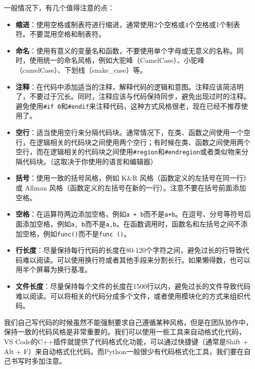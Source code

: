 \documentclass[../main.tex]{subfiles}
\begin{document}
一般情况下，有几个值得注意的点：
\begin{itemize}
  \item \textbf{缩进}：使用空格或制表符进行缩进，通常使用2个空格或4个空格或1个制表符。不要混用空格和制表符。
  \item \textbf{命名}：使用有意义的变量名和函数，不要使用单个字母或无意义的名称。同时，使用统一的命名风格，例如大驼峰（CamelCase）、小驼峰（camelCase）、下划线（snake\_case）等。
  \item \textbf{注释}：在代码中添加适当的注释，解释代码的逻辑和意图。注释应该简洁明了，不要过于冗长。同时，注释应该与代码保持同步，避免出现过时的注释。避免使用\texttt{\#if 0}和\texttt{\#endif}来注释代码，这种方式风格很老，现在已经不推荐使用了。
  \item \textbf{空行}：适当使用空行来分隔代码块。通常情况下，在类、函数之间使用一个空行，在逻辑相关的代码块之间使用两个空行；有时候在类、函数之间使用两个空行，而在逻辑相关的代码块之间使用\texttt{\#region}和\texttt{\#endregion}或者类似物来分隔代码块。（这取决于你使用的语言和编辑器）
  \item \textbf{括号}：使用一致的括号风格，例如 K\&R 风格（函数定义的左括号在同一行）或 Allman 风格（函数定义的左括号在新的一行）。注意不要在括号前面添加空格。
  \item \textbf{空格}：在运算符两边添加空格，例如\texttt{a + b}而不是\texttt{a+b}。在逗号、分号等符号后面添加空格，例如\texttt{a, b}而不是\texttt{a,b}。在函数调用时，函数名和左括号之间不添加空格，例如\texttt{func()}而不是\texttt{func ()}。
  \item \textbf{行长度}：尽量保持每行代码的长度在80-120个字符之间，避免过长的行导致代码难以阅读。可以使用换行符或者其他手段来分割长行。如果懒得数，也可以用半个屏幕为换行基准。
  \item \textbf{文件长度}：尽量保持每个文件的长度在1500行以内，避免过长的文件导致代码难以阅读。可以将相关的代码分成多个文件，或者使用模块化的方式来组织代码。
\end{itemize}

我们自己写代码的时候虽然不能强制要求自己遵循某种风格，但是在团队协作中，保持一致的代码风格是非常重要的。我们可以使用一些工具来自动格式化代码，VS Code的C++插件就提供了代码格式化功能，可以通过快捷键（通常是Shift + Alt + F）来自动格式化代码。而Python一般很少有代码格式化工具，我们要在自己书写时多加注意。
\end{document}

